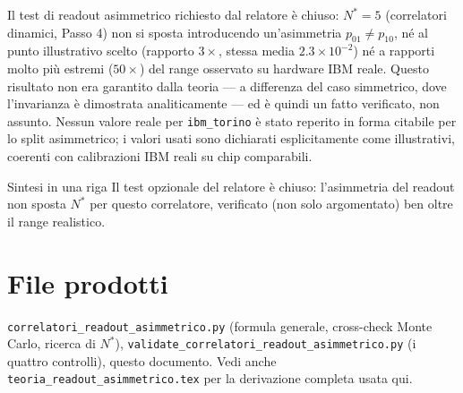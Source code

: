 \documentclass[11pt,a4paper]{article}
\begin{document}
Il test di readout asimmetrico richiesto dal relatore è chiuso: $N^*=5$
(correlatori dinamici, Passo 4) non si sposta introducendo un'asimmetria
$p_{01}\neq p_{10}$, né al punto illustrativo scelto (rapporto $3\times$,
stessa media $2.3\times10^{-2}$) né a rapporti molto più estremi
($50\times$) del range osservato su hardware IBM reale. Questo risultato
non era garantito dalla teoria --- a differenza del caso simmetrico, dove
l'invarianza è dimostrata analiticamente --- ed è quindi un fatto
verificato, non assunto. Nessun valore reale per \texttt{ibm\_torino} è
stato reperito in forma citabile per lo split asimmetrico; i valori usati
sono dichiarati esplicitamente come illustrativi, coerenti con
calibrazioni IBM reali su chip comparabili.

\begin{okbox}{Sintesi in una riga}
Il test opzionale del relatore è chiuso: l'asimmetria del readout non
sposta $N^*$ per questo correlatore, verificato (non solo argomentato)
ben oltre il range realistico.
\end{okbox}

\section*{File prodotti}

\texttt{correlatori\_readout\_asimmetrico.py} (formula generale,
cross-check Monte Carlo, ricerca di $N^*$),
\texttt{validate\_correlatori\_readout\_asimmetrico.py} (i quattro
controlli), questo documento. Vedi anche
\texttt{teoria\_readout\_asimmetrico.tex} per la derivazione completa
usata qui.
\end{document}
